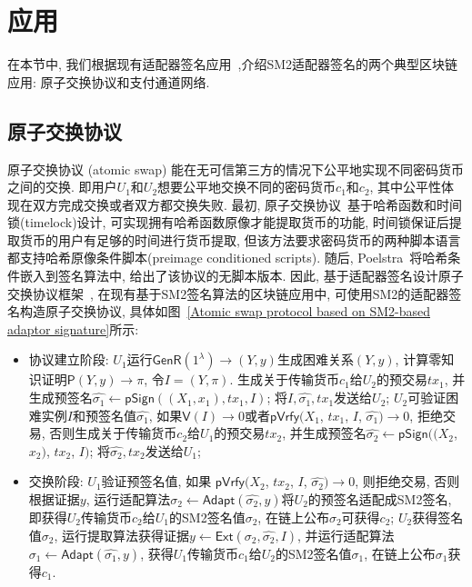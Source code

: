 \documentclass[review]{jcr}
\begin{document}
\section{应用} 

在本节中, 我们根据现有适配器签名应用~\cite{Poelstra2017,MalavoltaMSKM19,EsginEE20,AumayrEEFHMMR20},介绍SM2适配器签名的两个典型区块链应用: 原子交换协议和支付通道网络. 

\subsection{原子交换协议}

原子交换协议 (atomic swap) 能在无可信第三方的情况下公平地实现不同密码货币之间的交换. 即用户$U_1$和$U_2$想要公平地交换不同的密码货币$c_1$和$c_2$, 其中公平性体现在双方完成交换或者双方都交换失败. 最初, 原子交换协议~\cite{Nolan2013}基于哈希函数和时间锁(timelock)设计, 可实现拥有哈希函数原像才能提取货币的功能, 时间锁保证后提取货币的用户有足够的时间进行货币提取, 但该方法要求密码货币的两种脚本语言都支持哈希原像条件脚本(preimage conditioned scripts). 随后, Poelstra~\cite{Poelstra2017}将哈希条件嵌入到签名算法中, 给出了该协议的无脚本版本. 因此, 基于适配器签名设计原子交换协议框架~\cite{Nolan2013,Poelstra2017,EsginEE20}, 在现有基于SM2签名算法的区块链应用中, 可使用SM2的适配器签名构造原子交换协议, 具体如图~\ref{Atomic swap protocol based on SM2-based adaptor signature}所示: 

\begin{itemize}

\item 协议建立阶段: $U_1$运行$\mathsf{GenR}(1^\lambda)\rightarrow (Y,y)$生成困难关系$(Y,y)$, 计算零知识证明$\mathsf{P}(Y,y)\rightarrow \pi$, 令$I=(Y,\pi)$. 生成关于传输货币$c_1$给$U_2$的预交易$tx_1$, 并生成预签名$\hat{\sigma_1}\leftarrow \mathsf{pSign}((X_1,x_1), tx_1, I)$; 将$I, \hat{\sigma_1}, tx_1$发送给$U_2$; $U_2$可验证困难实例$I$和预签名值$\hat{\sigma_1}$, 如果$\mathsf{V}(I)\rightarrow 0$或者$\mathsf{pVrfy}$$(X_1$, $tx_1$, $I$, $\hat{\sigma_1})$$\rightarrow 0$, 拒绝交易, 否则生成关于传输货币$c_2$给$U_1$的预交易$tx_2$, 并生成预签名$\hat{\sigma_2}$$\leftarrow$$\mathsf{pSign}$$((X_2$, $x_2)$, $tx_2$, $I)$; 将$\hat{\sigma_2},tx_2$发送给$U_1$;

\item 交换阶段: $U_1$验证预签名值, 如果 $\mathsf{pVrfy}(X_2$, $tx_2$, $I$, $\hat{\sigma_2})$$\rightarrow 0$, 则拒绝交易, 否则根据证据$y$, 运行适配算法$\sigma_2\leftarrow \mathsf{Adapt}(\hat{\sigma_2},y)$将$U_2$的预签名适配成SM2签名, 即获得$U_2$传输货币$c_2$给$U_1$的SM2签名值$\sigma_2$, 在链上公布$\sigma_2$可获得$c_2$; $U_2$获得签名值$\sigma_2$, 运行提取算法获得证据$y\leftarrow \mathsf{Ext}(\sigma_2,\hat{\sigma_2}, I)$, 并运行适配算法$\sigma_1\leftarrow \mathsf{Adapt}(\hat{\sigma_1},y)$, 获得$U_1$传输货币$c_1$给$U_2$的SM2签名值$\sigma_1$, 在链上公布$\sigma_1$获得$c_1$.
\end{itemize}
\end{document}
